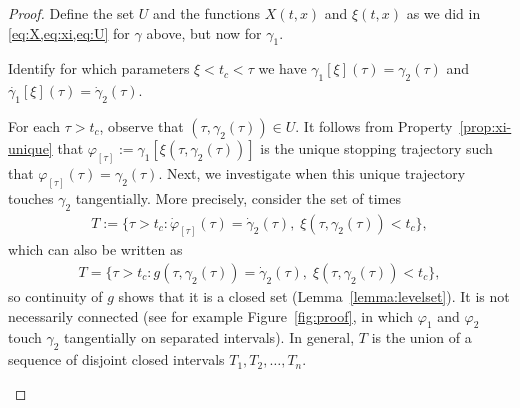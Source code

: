 \documentclass[a4paper]{article}
\theoremstyle{definition}
\theoremstyle{plain}
\begin{document}
\begin{proof}
  Define the set $U$ and the functions $X(t, x)$ and $\xi(t, x)$ as we did in \cref{eq:X,eq:xi,eq:U} for $\gamma$ above, but now for $\gamma_{1}$.
\begin{outline}



  \1 Identify for which parameters $\xi < t_{c} < \tau$ we have
  $\gamma_{1}[\xi](\tau) = \gamma_{2}(\tau)$ and $\dot{\gamma_{1}}[\xi](\tau) = \dot{\gamma}_{2}(\tau)$.

  \2 For each $\tau > t_{c}$, observe that $(\tau, \gamma_{2}(\tau)) \in U$. It follows
  from Property~\ref{prop:xi-unique} that
  $\varphi_{[\tau]} := \gamma_{1}[\xi(\tau, \gamma_{2}(\tau))]$ is the unique stopping trajectory such
  that $\varphi_{[\tau]}(\tau) = \gamma_{2}(\tau)$.
  Next, we investigate when this unique trajectory touches $\gamma_{2}$
  tangentially. More precisely, consider the set of times
  \begin{align}
    T := \{ \tau > t_{c} : \dot{\varphi}_{[\tau]}(\tau) = \dot{\gamma}_{2}(\tau), \; \xi(\tau, \gamma_{2}(\tau)) < t_{c} \},
  \end{align}
  which can also be written as
  \begin{align}
    T = \{ \tau > t_{c} : g(\tau, \gamma_{2}(\tau)) = \dot{\gamma}_{2}(\tau), \; \xi(\tau, \gamma_{2}(\tau)) < t_{c} \} ,
  \end{align}
  so continuity of $g$ shows that it is a closed set (Lemma~\ref{lemma:levelset}). It is not
  necessarily connected (see for example Figure~\ref{fig:proof}, in which $\varphi_{1}$ and
  $\varphi_{2}$ touch $\gamma_{2}$ tangentially on separated intervals). In
  general, $T$ is the union of a sequence of disjoint closed intervals
  $T_{1}, T_{2}, \dots, T_{n}$.


\end{outline}
\end{proof}
\end{document}
